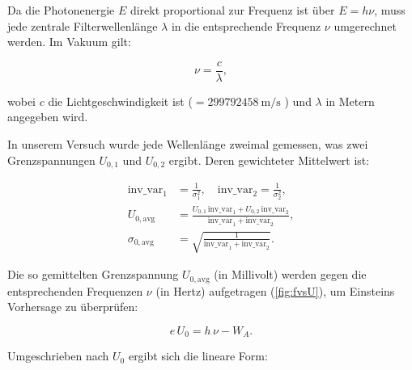 Da die Photonenergie $E$ direkt proportional zur Frequenz ist über $E = h\nu$, muss jede zentrale Filterwellenlänge $\lambda$ in die entsprechende Frequenz $\nu$ umgerechnet werden. Im Vakuum gilt:

\begin{equation}
    \nu = \frac{c}{\lambda},
\end{equation}

wobei $c$ die Lichtgeschwindigkeit ist ($= \SI{299 792 458}{\metre\per\second}$ \cite{codata}) und $\lambda$ in Metern angegeben wird.

In unserem Versuch wurde jede Wellenlänge zweimal gemessen, was zwei Grenzspannungen $U_{0,1}$ und $U_{0,2}$ ergibt. Deren gewichteter Mittelwert ist:

\begin{equation}
  \begin{aligned}
    \mathrm{inv\_var}_1 &= \frac{1}{\sigma_{1}^{2}},\quad
    \mathrm{inv\_var}_2 = \frac{1}{\sigma_{2}^{2}},\\[1ex]
    U_{0,\mathrm{avg}}  &= \frac{U_{0,1}\,\mathrm{inv\_var}_1 + U_{0,2}\,\mathrm{inv\_var}_2}
                               {\mathrm{inv\_var}_1 + \mathrm{inv\_var}_2},\\[1ex]
    \sigma_{0,\mathrm{avg}} &= \sqrt{\frac{1}{\mathrm{inv\_var}_1 + \mathrm{inv\_var}_2}}.
  \end{aligned}
\end{equation}

Die so gemittelten Grenzspannung $U_{0,\mathrm{avg}}$ (in Millivolt) werden gegen die entsprechenden Frequenzen $\nu$ (in Hertz) aufgetragen (\cref{fig:fvsU}), um Einsteins Vorhersage zu überprüfen:

\begin{equation}
  e\,U_{0} = h\,\nu - W_{A}.
\end{equation}

Umgeschrieben nach $U_{0}$ ergibt sich die lineare Form:

